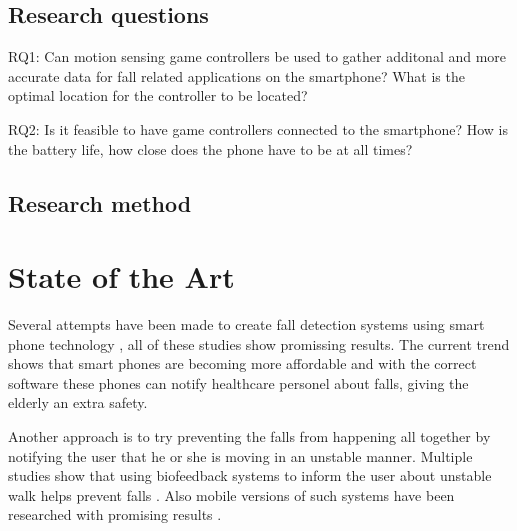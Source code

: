\documentclass[11pt,twoside,a4paper]{report}
\begin{document}
\section{Research questions}
RQ1: Can motion sensing game controllers be used to gather additonal and more accurate data for fall related applications on the smartphone? What is the optimal location for the controller to be located?

RQ2: Is it feasible to have game controllers connected to the smartphone? How is the battery life, how close does the phone have to be at all times?

\section{Research method}



\chapter{State of the Art}

Several attempts have been made to create fall detection systems using smart phone technology \cite{iFall, semiSupervisedFallDetection, mobilePhoneBasedFallDetection, detectionOfFalls}, all of these studies show promissing results. The current trend shows that smart phones are becoming more affordable \cite{find_some_data_here} and with the correct software these phones can notify healthcare personel about falls, giving the elderly an extra safety.

Another approach is to try preventing the falls from happening all together by notifying the user that he or she is moving in an unstable manner. Multiple studies show that using biofeedback systems to inform the user about unstable walk helps prevent falls \cite{multiModualBiofeedback, vibrotactileBiofeedback, vibrotactileTiltFeedback}. %
Also mobile versions of such systems have been researched with promising results \cite{fallPrevention}.
\end{document}
